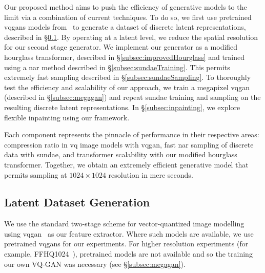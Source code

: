 

Our proposed method aims to push the efficiency of generative models to the
limit via a combination of current techniques. To do so, we first use pretrained
\glspl{vqgan} models from~\cite{esser2021taming} to generate a dataset of
discrete latent representations, described in \S\ref{subsec:datasetGen}. By
operating at a latent level, we reduce the spatial resolution for our second
stage generator. We implement our generator as a modified hourglass transformer,
described in \S\ref{subsec:improvedHourglass} and trained using a \gls{nar}
method described in \S\ref{subsec:sundaeTraining}. This permits extremely fast
sampling described in \S\ref{subsec:sundaeSampling}. To thoroughly test the
efficiency and scalability of our approach, we train a megapixel \gls{vqgan}
(described in \S\ref{subsec:megagan}) and repeat \gls{sundae} training and
sampling on the resulting discrete latent representations. In
\S\ref{subsec:inpainting}, we explore flexible inpainting using our framework.

Each component represents the pinnacle of performance in their respective areas:
compression ratio in \gls{vq} image models with \gls{vqgan}, fast \acrlong{nar}
sampling of discrete data with \gls{sundae}, and transformer scalability with
our modified hourglass transformer. Together, we obtain an extremely efficient
generative model that permits sampling at $1024 \times 1024$ resolution in mere
seconds.

\subsection{Latent Dataset Generation}
\label{subsec:datasetGen}

We use the standard two-stage scheme for vector-quantized image
modelling~\cite{oord2018neural,razavi2019generating,esser2021taming,bondtaylor2021unleashing}
using \gls{vqgan}~\cite{esser2021taming} as our feature extractor. Where such
models are available, we use pretrained \glspl{vqgan} for our experiments. For
higher resolution experiments (for example,
FFHQ1024~\cite{karras2019stylebased}), pretrained models are not available and
so the training our own VQ-GAN was necessary (see \S\ref{subsec:megagan}). 

